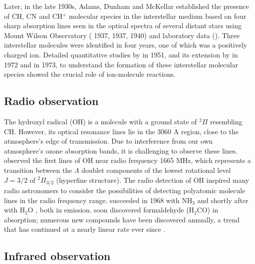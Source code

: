 Later, in the late 1930s, Adams, Dunham and McKellar established the presence of CH, CN and CH$^+$ molecular species in the interstellar medium  based on four sharp absorption lines seen in the optical spectra of several distant stars using Mount Wilson Observatory (\citet{dunham_jr_interstellar_1937} 1937, \citet{adams_quoted_1937} 1937, \citet{mckellar_evidence_1940, mckellar_wave_1940} 1940) and laboratory data (\citet{jenkins_mass_1938, douglas_note_1941, douglas_band_1942}). Three interstellar molecules were identified in four years, one of which was a positively charged ion. Detailed quantitative studies by \citet{bates_density_1951} in 1951, and its extension by \citet{solomon_formation_1972} in 1972 and \citet{herbst_formation_1973} in 1973, to understand the formation of these interstellar molecular species showed the crucial role of ion-molecule reactions.

\subsection{Radio observation}
\label{subsec:intro:radio}

The hydroxyl radical (OH) is a molecule with a ground state of $^2\Pi$ resembling CH. However, its optical resonance lines lie in the 3060 $\mathring{\text{A}}$ region, close to the atmosphere's edge of transmission. Due to interference from our own atmosphere's ozone absorption bands, it is challenging to observe these lines. \citet{weinreb_radio_1963} \citeyear{weinreb_radio_1963} observed the first lines of OH near radio frequency 1665 MHz, which represents a transition between the $\Lambda$ doublet components of the lowest rotational level $J=3/2$ of $^2\Pi_{3/2}$ (hyperfine structure). The radio detection of OH inspired many radio astronomers to consider the possibilities of detecting polyatomic molecule lines in the radio frequency range. \citet{cheung_detection_1968} succeeded in 1968 with NH$_3$ and shortly after with H$_2$O \cite{cheung_detection_1969}, both in emission. \citet{snyder_microwave_1969} soon discovered formaldehyde (H$_2$CO) in absorption; numerous new compounds have been discovered annually, a trend that has continued at a nearly linear rate ever since \cite{mcguire_2021_2021}.

\subsection{Infrared observation}
\label{subsec:intro:IR}

